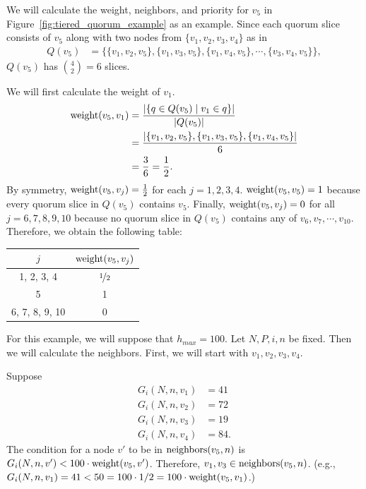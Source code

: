 \begin{exmp}
    We will calculate the weight, neighbors, and priority for $v_5$ in Figure~\ref{fig:tiered_quorum_example} as an example.
    Since each quorum slice consists of $v_5$ along with two nodes from $\{ v_1, v_2, v_3, v_4 \}$ as in
    \begin{align*}
        Q(v_5) &= \{ \{ v_1, v_2, v_5 \}, \{ v_1, v_3, v_5 \}, \{ v_1, v_4, v_5 \}, \cdots, \{ v_3, v_4, v_5 \} \},
    \end{align*}
    $Q(v_5)$ has $\binom{4}{2} = 6$ slices.

    We will first calculate the weight of $v_1$.
    \begin{align*}
        \operatorname{weight}(v_5, v_1)
            &= \frac{\abs{\{ q \in Q(v_5) \mid v_1 \in q \}}}{\abs{Q(v_5)}} \\
            &= \frac{\abs{ \{ v_1, v_2, v_5 \}, \{ v_1, v_3, v_5 \}, \{ v_1, v_4, v_5 \}}}{6} \\
            &= \frac{3}{6} = \frac{1}{2}.
    \end{align*}
    By symmetry, $\operatorname{weight}(v_5, v_j) = \frac{1}{2}$ for each $j = 1, 2, 3, 4$.
    $\operatorname{weight}(v_5, v_5) = 1$ because every quorum slice in $Q(v_5)$ contains $v_5$.
    Finally, $\operatorname{weight}(v_5, v_j) = 0$ for all $j = 6, 7, 8, 9, 10$ because no quorum slice in $Q(v_5)$ contains any of $v_6, v_7, \cdots, v_{10}$.
    Therefore, we obtain the following table:
    \begin{center}
      \begin{tabular}{ | c | c | }
        \hline
          $j$ & $\operatorname{weight}(v_5, v_j)$ \\ \hline
          1, 2, 3, 4 & $\nicefrac{1}{2}$ \\ \hline 
          5 & 1 \\ \hline 
          6, 7, 8, 9, 10 & 0 \\
        \hline
      \end{tabular}
    \end{center}

    For this example, we will suppose that $h_{max} = 100$.
    Let $N, P, i, n$ be fixed.
    Then we will calculate the neighbors.
    First, we will start with $v_1, v_2, v_3, v_4$.

    Suppose
    \begin{align*}
        G_i(N, n, v_1) &= 41 \\
        G_i(N, n, v_2) &= 72 \\
        G_i(N, n, v_3) &= 19 \\
        G_i(N, n, v_4) &= 84.
    \end{align*}
    The condition for a node $v'$ to be in $\operatorname{neighbors}(v_5, n)$ is $G_i(N, n, v') < 100 \cdot \operatorname{weight}(v_5, v')$.
    Therefore, $v_1, v_3 \in \operatorname{neighbors}(v_5, n)$.
    (e.g., $G_i(N, n, v_1) = 41 < 50 = 100 \cdot 1/2 = 100 \cdot \operatorname{weight}(v_5, v_1)$.)


\end{exmp}
